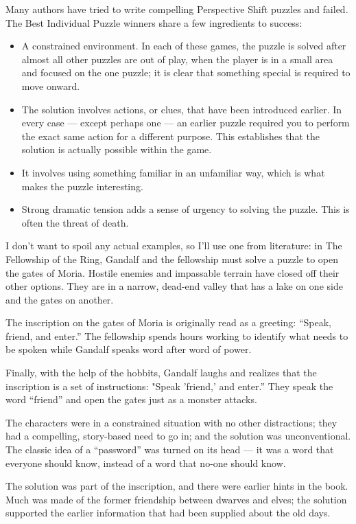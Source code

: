 Many authors have tried to write compelling Perspective Shift puzzles and failed. The Best Individual Puzzle winners share a few ingredients to success:
\begin{itemize}[leftmargin=0em]
\item{A constrained environment. In each of these games, the puzzle is solved after almost all other puzzles are out of play, when the player is in a small area and focused on the one puzzle; it is clear that something special is required to move onward.}
\item{The solution involves actions, or clues, that have been introduced earlier. In every case — except perhaps one — an earlier puzzle required you to perform the exact same action for a different purpose. This establishes that the solution is actually possible within the game.}
\item{It involves using something familiar in an unfamiliar way, which is what makes the puzzle interesting.}
\item{Strong dramatic tension adds a sense of urgency to solving the puzzle. This is often the threat of death.}
\end{itemize}
I don’t want to spoil any actual examples, so I’ll use one from literature: in The Fellowship of the Ring, Gandalf and the fellowship must solve a puzzle to open the gates of Moria. Hostile enemies and impassable terrain have closed off their other options. They are in a narrow, dead-end valley that has a lake on one side and the gates on another. 

The inscription on the gates of Moria is originally read as a greeting: “Speak, friend, and enter.” The fellowship spends hours working to identify what needs to be spoken while Gandalf speaks word after word of power.

Finally, with the help of the hobbits, Gandalf laughs and realizes that the inscription is a set of instructions: "Speak 'friend,' and enter.” They speak the word “friend” and open the gates just as a monster attacks.

The characters were in a constrained situation with no other distractions; they had a compelling, story-based need to go in; and the solution was unconventional. The classic idea of a “password” was turned on its head — it was a word that everyone should know, instead of a word that no-one should know. 

The solution was part of the inscription, and there were earlier hints in the book. Much was made of the former friendship between dwarves and elves; the solution supported the earlier information that had been supplied about the old days.

